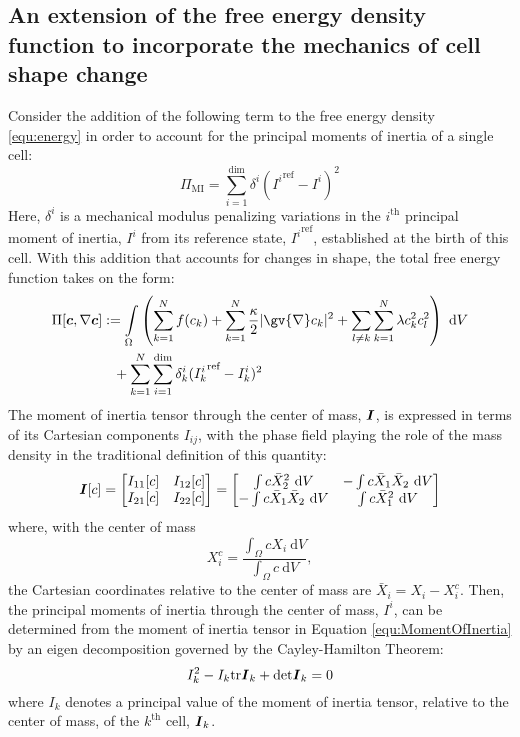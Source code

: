 \documentclass{article}
\newcommand{\grad}[1]{\gv{\nabla} #1}
\def\bI{\mbox{\boldmath$ I$}}
\def\bc{\mbox{\boldmath$ c$}}
\begin{document}
\subsection{An extension of the free energy density function to incorporate the mechanics of cell shape change}
Consider the addition of the following term to the free energy density \eqref{equ:energy} in order to account for the principal moments of inertia of a single cell: 
\begin{equation}
\Pi_{\text{MI}} = \sum_{i=1}^{\text{dim}}\delta^i ({I^i} ^\text{ref}-I^i)^2
\label{equ:MI}
\end{equation}
Here,  $\delta^i$ is a mechanical modulus penalizing variations in the $i^\text{th}$ principal moment of inertia, $I^i$ from its  reference state, ${I^i}^\text{ref}$, established at the birth of this cell. With this addition that accounts for changes in shape, the total free energy function takes on the form:
\begin{align}
\Pi[\bc,\nabla\bc] &:= \int\limits_{\Omega} \left(\sum_{k=1}^{N} f(c_k) + \sum_{k=1}^{N} \frac{\kappa}{2}\vert\grad c_k\vert^2 + \sum_{l\ne k}\sum_{k=1}^{N}\lambda c_k^2 c_l^2 \right) ~\text{d}V\nonumber\\
&\phantom{+}+ \sum_{k=1}^{N}\sum_{i=1}^{\text{dim}}\delta_k^i ({I_k^i} ^\text{ref}-I_k^i)^2
\end{align}
The moment of inertia tensor through the center of mass, $\bI$, is expressed in terms of its Cartesian components $I_{ij}$, with the phase field playing the role of the mass density in the traditional definition of this quantity:
\begin{equation}
\bI[c] = 
\begin{bmatrix}
I_{11}[c] & I_{12}[c] \\
I_{21}[c] & I_{22}[c]
\end{bmatrix}
=
\begin{bmatrix}
\int c \bar{X}_2^2 ~\text{d}V   & -\int c\bar{X}_1 \bar{X}_2 ~\text{d}V\\
-\int c\bar{X}_1 \bar{X}_2 ~\text{d}V & \int c\bar{X}_1^2 ~\text{d}V
\end{bmatrix}
\label{equ:MomentOfInertia}
\end{equation}
where, with the center of mass
\begin{equation}
    X^c_i = \frac{\int_\Omega c X_i ~\text{d}V}{\int_\Omega c ~\text{d}V},
    \label{equ:masscenter}
\end{equation} the Cartesian coordinates relative to the center of mass are $\bar{X}_{i} = X_{i}-X^c_{i}$. Then, the principal moments of inertia through the center of mass, $I^i$, can be determined from the moment of inertia tensor in Equation \eqref{equ:MomentOfInertia} by an eigen decomposition governed by the Cayley-Hamilton Theorem:
\begin{equation}
    I_k^2 - I_k\text{tr}\bI_k + \text{det}\bI_k = 0
    \label{equ:CHThm}
\end{equation}
where $I_k$ denotes a principal value of the moment of inertia tensor, relative to the center of mass, of the $k^\text{th}$ cell, $\bI_k$.
\end{document}
